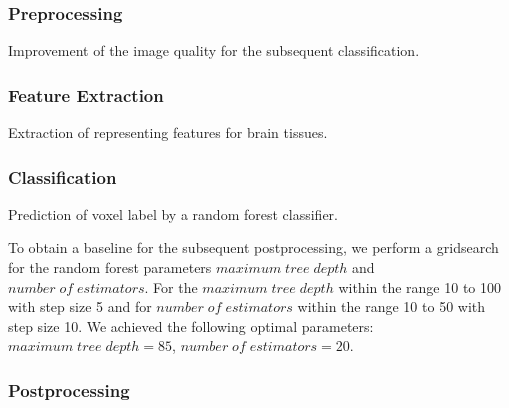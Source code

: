 \documentclass[journal]{IEEEtran}
\begin{document}
\subsubsection{Preprocessing}

Improvement of the image quality for the subsequent classification.

\subsubsection{Feature Extraction}

Extraction of representing features for brain tissues.

\subsubsection{Classification}

Prediction of voxel label by a random forest classifier.

To obtain a baseline for the subsequent postprocessing, we perform a gridsearch for the random forest parameters $maximum\; tree\; depth$ and $number\; of\; estimators$. For the $maximum\; tree\; depth$ within the range 10 to 100 with step size 5 and for $number\; of\; estimators$ within the range 10 to 50 with step size 10. We achieved the following optimal parameters: $maximum\; tree\; depth = 85$, $number\; of\; estimators = 20$.
\subsubsection{Postprocessing}
\end{document}
